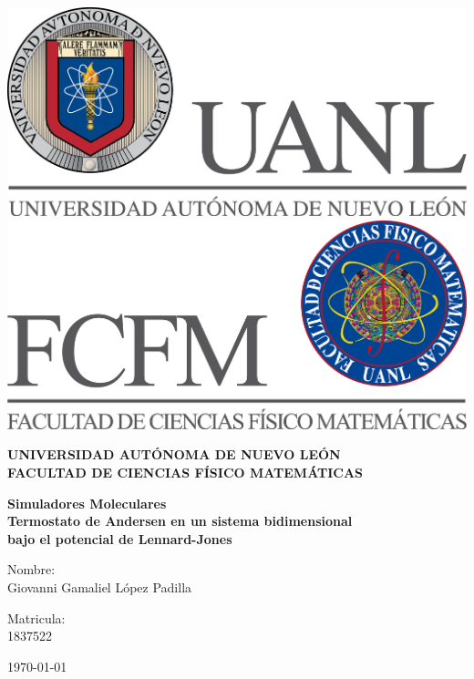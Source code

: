 \begin{titlepage}
    \begin{center}
    \includegraphics[scale=0.40]{../../../Logos/uanl.png} 
    \hspace{2.5cm}
    \includegraphics[scale=0.40]{../../../Logos/fcfm.png}
    \end{center}
    \vspace{2cm}
    \begin{center}
    \textbf{
    UNIVERSIDAD AUTÓNOMA DE NUEVO LEÓN\\
    FACULTAD DE CIENCIAS
    FÍSICO MATEMÁTICAS}\\
    \vspace*{2cm}
    \begin{large}
    \vspace{1cm}
    \textbf{Simuladores Moleculares\vspace{0.5cm}\\
    Termostato de Andersen en un sistema bidimensional\\ bajo el 
    potencial de Lennard-Jones\\}
    \end{large}
    \vspace{3.5cm}
    \begin{minipage}{0.6\linewidth}
    \vspace{0.5cm}
    \changefontsizes{14pt}
    Nombre:\\
    Giovanni Gamaliel López Padilla\\
    \end{minipage}
    \begin{minipage}{0.2\linewidth}
    \changefontsizes{14pt}
    Matricula:\\
    1837522
    \end{minipage}
    \end{center}
    \vspace{4cm}
    \begin{flushright}
    \today
    \end{flushright}
    \pagebreak
    \end{titlepage}